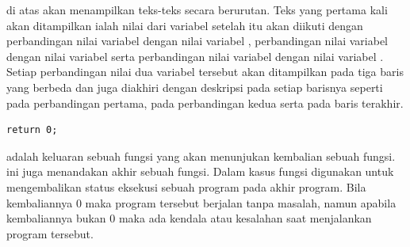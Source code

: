 \documentclass[../main.tex]{subfiles}
\begin{document}
{\Script} di atas akan menampilkan teks-teks secara berurutan. Teks yang pertama kali akan ditampilkan ialah nilai dari variabel  setelah itu akan diikuti dengan perbandingan nilai variabel  dengan nilai variabel , perbandingan nilai variabel  dengan nilai variabel  serta perbandingan nilai variabel  dengan nilai variabel . Setiap perbandingan nilai dua variabel tersebut akan ditampilkan pada tiga baris yang berbeda dan juga diakhiri dengan deskripsi pada setiap barisnya seperti  pada perbandingan pertama,  pada perbandingan kedua serta  pada baris terakhir.

\begin{code}
\begin{verbatim}
return 0;
\end{verbatim}
\end{code}

{\Script}  adalah {\statement} keluaran sebuah fungsi yang akan menunjukan kembalian sebuah fungsi. {\Statement} ini juga menandakan akhir sebuah fungsi. Dalam kasus fungsi  {\statement}  digunakan untuk mengembalikan status eksekusi sebuah program pada akhir program. Bila kembaliannya 0 maka program tersebut berjalan tanpa masalah, namun apabila kembaliannya bukan 0 maka ada kendala atau kesalahan saat menjalankan program tersebut.
\end{document}
